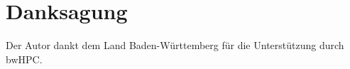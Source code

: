 \chapter*{Danksagung}


Der Autor dankt dem Land Baden-Württemberg für die Unterstützung durch bwHPC.


